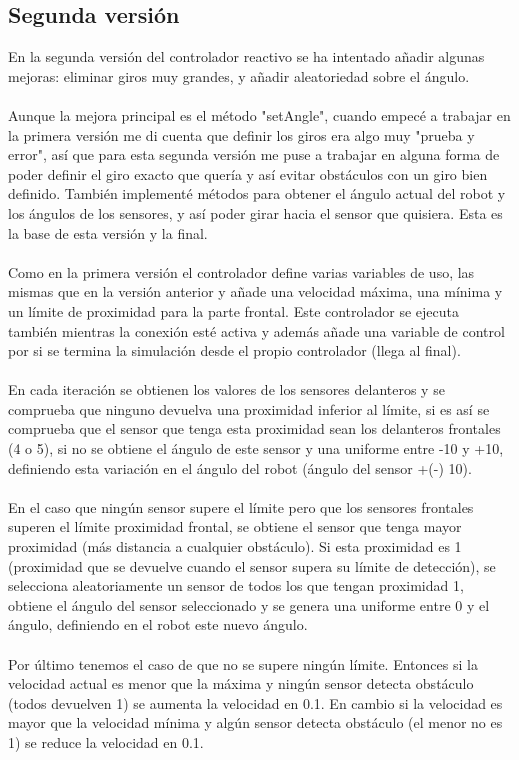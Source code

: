 \documentclass[14pt]{extarticle}
\theoremstyle{definition}
\theoremstyle{remark}
\begin{document}
\subsection{Segunda versión}\label{subsec:segundaversion}
En la segunda versión del controlador reactivo se ha intentado añadir algunas mejoras: eliminar giros muy grandes, y añadir aleatoriedad sobre el ángulo.\\\\
Aunque la mejora principal es el método "setAngle", cuando empecé a trabajar en la primera versión me di cuenta que definir los giros era algo muy "prueba y error", así que para esta segunda versión me puse a trabajar en alguna forma de poder definir el giro exacto que quería y así evitar obstáculos con un giro bien definido. También implementé métodos para obtener el ángulo actual del robot y los ángulos de los sensores, y así poder girar hacia el sensor que quisiera. Esta es la base de esta versión y la final.\\\\
Como en la primera versión el controlador define varias variables de uso, las mismas que en la versión anterior y añade una velocidad máxima, una mínima y un límite de proximidad para la parte frontal. Este controlador se ejecuta también mientras la conexión esté activa y además añade una variable de control por si se termina la simulación desde el propio controlador (llega al final).\\\\
En cada iteración se obtienen los valores de los sensores delanteros y se comprueba que ninguno devuelva una proximidad inferior al límite, si es así se comprueba que el sensor que tenga esta proximidad sean los delanteros frontales (4 o 5), si no se obtiene el ángulo de este sensor y una uniforme entre -10 y +10, definiendo esta variación en el ángulo del robot (ángulo del sensor +(-) 10).\\\\
En el caso que ningún sensor supere el límite pero que los sensores frontales superen el límite proximidad frontal, se obtiene el sensor que tenga mayor proximidad (más distancia a cualquier obstáculo). Si esta proximidad es 1 (proximidad que se devuelve cuando el sensor supera su límite de detección), se selecciona aleatoriamente un sensor de todos los que tengan proximidad 1, obtiene el ángulo del sensor seleccionado y se genera una uniforme entre 0 y el ángulo, definiendo en el robot este nuevo ángulo.\\\\
Por último tenemos el caso de que no se supere ningún límite. Entonces si la velocidad actual es menor que la máxima y ningún sensor detecta obstáculo (todos devuelven 1) se aumenta la velocidad en 0.1. En cambio si la velocidad es mayor que la velocidad mínima y algún sensor detecta obstáculo (el menor no es 1) se reduce la velocidad en 0.1.
\end{document}
